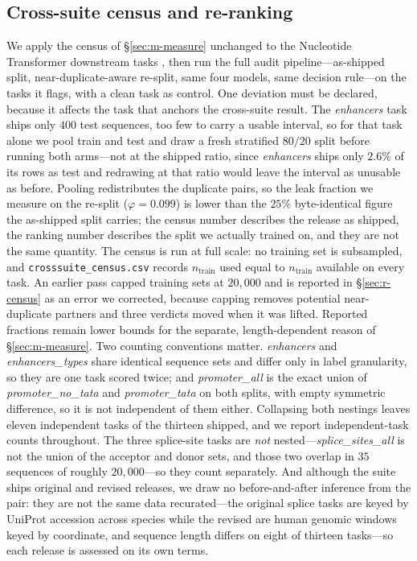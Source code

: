 \documentclass[webpdf,modern,large,namedate]{oup-authoring-template}%
\begin{document}
\subsection{Cross-suite census and re-ranking}\label{sec:m-census}
We apply the census of \S\ref{sec:m-measure} unchanged to the Nucleotide Transformer downstream tasks \citep{dallatorre2024nucleotide}, then run the full audit pipeline---as-shipped split, near-duplicate-aware re-split, same four models, same decision rule---on the tasks it flags, with a clean task as control. One deviation must be declared, because it affects the task that anchors the cross-suite result. The \textit{enhancers} task ships only $400$ test sequences, too few to carry a usable interval, so for that task alone we pool train and test and draw a fresh stratified $80/20$ split before running both arms---not at the shipped ratio, since \textit{enhancers} ships only $2.6\%$ of its rows as test and redrawing at that ratio would leave the interval as unusable as before. Pooling redistributes the duplicate pairs, so the leak fraction we measure on the re-split ($\varphi=0.099$) is lower than the $25\%$ byte-identical figure the as-shipped split carries; the census number describes the release as shipped, the ranking number describes the split we actually trained on, and they are not the same quantity. The census is run at full scale: no training set is subsampled, and \texttt{crosssuite\_census.csv} records $n_{\text{train}}$ used equal to $n_{\text{train}}$ available on every task. An earlier pass capped training sets at $20{,}000$ and is reported in \S\ref{sec:r-census} as an error we corrected, because capping removes potential near-duplicate partners and three verdicts moved when it was lifted. Reported fractions remain lower bounds for the separate, length-dependent reason of \S\ref{sec:m-measure}. Two counting conventions matter. \textit{enhancers} and \textit{enhancers\_types} share identical sequence sets and differ only in label granularity, so they are one task scored twice; and \textit{promoter\_all} is the exact union of \textit{promoter\_no\_tata} and \textit{promoter\_tata} on both splits, with empty symmetric difference, so it is not independent of them either. Collapsing both nestings leaves eleven independent tasks of the thirteen shipped, and we report independent-task counts throughout. The three splice-site tasks are \emph{not} nested---\textit{splice\_sites\_all} is not the union of the acceptor and donor sets, and those two overlap in $35$ sequences of roughly $20{,}000$---so they count separately. And although the suite ships original and revised releases, we draw no before-and-after inference from the pair: they are not the same data recurated---the original splice tasks are keyed by UniProt accession across species while the revised are human genomic windows keyed by coordinate, and sequence length differs on eight of thirteen tasks---so each release is assessed on its own terms.
\end{document}
